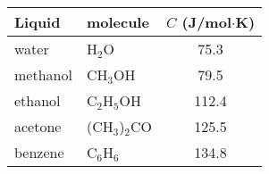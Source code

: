 \begin{tabular}{llc}
\hline\hline
Liquid & molecule & $C$ (J/mol$\cdot$K) \\ \hline
\noalign{\smallskip}
water & H$_2$O & 75.3 \\
methanol & CH$_3$OH & 79.5 \\
ethanol & C$_2$H$_5$OH  &  112.4 \\
acetone & (CH$_3$)$_2$CO & 125.5 \\
benzene & C$_6$H$_6$ & 134.8 \\
\hline\hline
\end{tabular}
